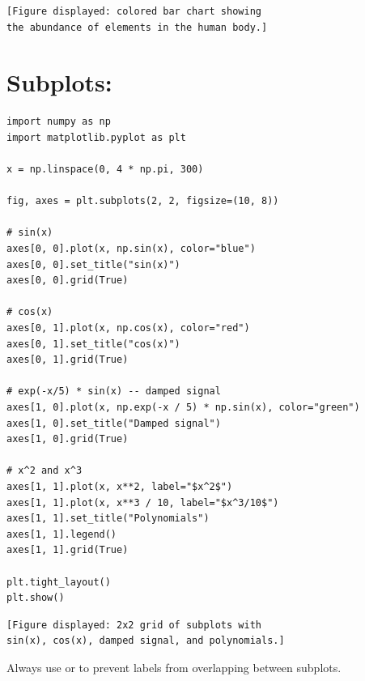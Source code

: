 \begin{codeoutput}
\begin{verbatim}
[Figure displayed: colored bar chart showing
the abundance of elements in the human body.]
\end{verbatim}
\end{codeoutput}

\section{Subplots: }

\begin{codeblock}[title=\textbf{Python}]
\begin{verbatim}
import numpy as np
import matplotlib.pyplot as plt

x = np.linspace(0, 4 * np.pi, 300)

fig, axes = plt.subplots(2, 2, figsize=(10, 8))

# sin(x)
axes[0, 0].plot(x, np.sin(x), color="blue")
axes[0, 0].set_title("sin(x)")
axes[0, 0].grid(True)

# cos(x)
axes[0, 1].plot(x, np.cos(x), color="red")
axes[0, 1].set_title("cos(x)")
axes[0, 1].grid(True)

# exp(-x/5) * sin(x) -- damped signal
axes[1, 0].plot(x, np.exp(-x / 5) * np.sin(x), color="green")
axes[1, 0].set_title("Damped signal")
axes[1, 0].grid(True)

# x^2 and x^3
axes[1, 1].plot(x, x**2, label="$x^2$")
axes[1, 1].plot(x, x**3 / 10, label="$x^3/10$")
axes[1, 1].set_title("Polynomials")
axes[1, 1].legend()
axes[1, 1].grid(True)

plt.tight_layout()
plt.show()
\end{verbatim}
\end{codeblock}

\begin{codeoutput}
\begin{verbatim}
[Figure displayed: 2x2 grid of subplots with
sin(x), cos(x), damped signal, and polynomials.]
\end{verbatim}
\end{codeoutput}

\begin{bestpractice}
Always use  or  to prevent
labels from overlapping between subplots.
\end{bestpractice}

